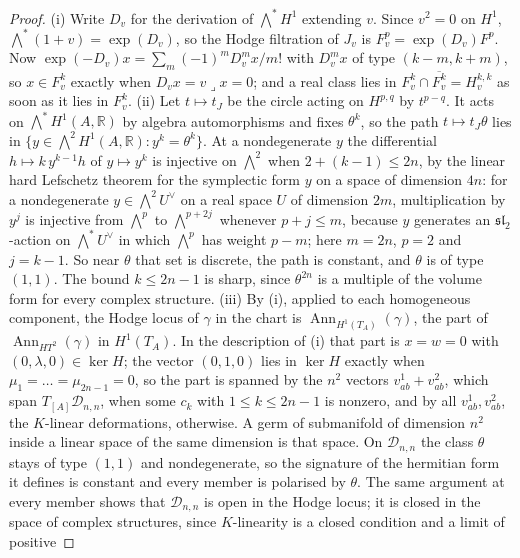 \documentclass[11pt,reqno]{amsart}
\theoremstyle{plain}
\theoremstyle{definition}
\theoremstyle{remark}
\newcommand{\RR}{\mathbb{R}}
\newcommand{\cD}{\mathcal{D}}
\DeclareMathOperator{\Ann}{Ann}
\begin{document}
\begin{proof}
(i) Write $D_{v}$ for the derivation of $\bigwedge^{*}H^{1}$ extending $v$.
Since $v^{2}=0$ on $H^{1}$, $\bigwedge^{*}(1+v)=\exp(D_{v})$, so the Hodge
filtration of $J_{v}$ is $F^{p}_{v}=\exp(D_{v})F^{p}$. Now
$\exp(-D_{v})x=\sum_{m}(-1)^{m}D_{v}^{m}x/m!$ with $D_{v}^{m}x$ of type
$(k-m,k+m)$, so $x\in F^{k}_{v}$ exactly when $D_{v}x=v\lrcorner x=0$; and a
real class lies in $F^{k}_{v}\cap\overline{F^{k}_{v}}=H^{k,k}_{v}$ as soon as
it lies in $F^{k}_{v}$. (ii) Let $t\mapsto t_{J}$ be the circle acting on
$H^{p,q}$ by $t^{p-q}$. It acts on $\bigwedge^{*}H^{1}(A,\RR)$ by algebra
automorphisms and fixes $\theta^{k}$, so the path $t\mapsto t_{J}\theta$ lies in
$\{y\in\bigwedge^{2}H^{1}(A,\RR):y^{k}=\theta^{k}\}$. At a nondegenerate $y$
the differential $h\mapsto k\,y^{k-1}h$ of $y\mapsto y^{k}$ is injective on
$\bigwedge^{2}$ when $2+(k-1)\le2n$, by the linear hard Lefschetz theorem for
the symplectic form $y$ on a space of dimension $4n$: for a nondegenerate
$y\in\bigwedge^{2}U^{\vee}$ on a real space $U$ of dimension $2m$,
multiplication by $y^{j}$ is injective from $\bigwedge^{p}$ to
$\bigwedge^{p+2j}$ whenever $p+j\le m$, because $y$ generates an
$\mathfrak{sl}_{2}$-action on $\bigwedge^{*}U^{\vee}$ in which $\bigwedge^{p}$
has weight $p-m$; here $m=2n$, $p=2$ and $j=k-1$. So near $\theta$ that set
is discrete, the path is constant, and $\theta$ is of type $(1,1)$. The bound
$k\le2n-1$ is sharp, since $\theta^{2n}$ is a multiple of the volume form for
every complex structure. (iii) By
(i), applied to each homogeneous component, the Hodge locus of $\gamma$ in the
chart is $\Ann_{H^{1}(T_{A})}(\gamma)$, the part of $\Ann_{HT^{2}}(\gamma)$ in
$H^{1}(T_{A})$. In the description of (i) that part is
$x=w=0$ with $(0,\lambda,0)\in\ker H$; the vector $(0,1,0)$ lies in $\ker H$
exactly when $\mu_{1}=\dots=\mu_{2n-1}=0$, so the part is spanned by the $n^{2}$
vectors $v^{1}_{ab}+v^{2}_{ab}$, which span $T_{[A]}\cD_{n,n}$, when some
$c_{k}$ with $1\le k\le2n-1$ is nonzero, and by all $v^{1}_{ab},v^{2}_{ab}$,
the $K$-linear deformations, otherwise. A germ of submanifold of dimension
$n^{2}$ inside a linear space of the same dimension is that space. On
$\cD_{n,n}$ the class $\theta$ stays of type $(1,1)$ and nondegenerate, so the
signature of the hermitian form it defines is constant and every member is
polarised by $\theta$. The same argument at every member shows that
$\cD_{n,n}$ is open in the Hodge locus; it is closed in the space of complex
structures, since $K$-linearity is a closed condition and a limit of positive

\end{proof}
\end{document}
